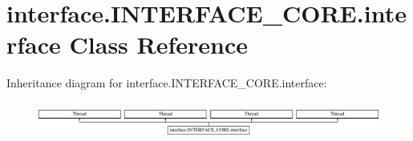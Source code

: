 \hypertarget{classinterface_1_1INTERFACE__CORE_1_1interface}{}\section{interface.\+I\+N\+T\+E\+R\+F\+A\+C\+E\+\_\+\+C\+O\+R\+E.\+interface Class Reference}
\label{classinterface_1_1INTERFACE__CORE_1_1interface}
Inheritance diagram for interface.\+I\+N\+T\+E\+R\+F\+A\+C\+E\+\_\+\+C\+O\+R\+E.\+interface\+:\begin{figure}[H]
\begin{center}
\leavevmode
\includegraphics[height=1.171548cm]{classinterface_1_1INTERFACE__CORE_1_1interface}
\end{center}
\end{figure}
